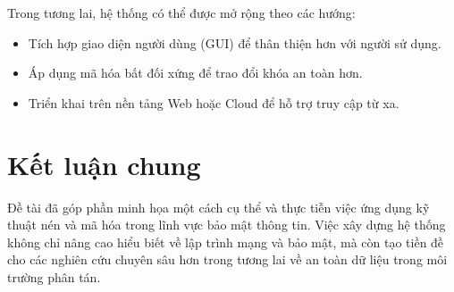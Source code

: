 Trong tương lai, hệ thống có thể được mở rộng theo các hướng:

\begin{itemize}
  \item Tích hợp giao diện người dùng (GUI) để thân thiện hơn với người sử dụng.
  \item Áp dụng mã hóa bất đối xứng để trao đổi khóa an toàn hơn.
  \item Triển khai trên nền tảng Web hoặc Cloud để hỗ trợ truy cập từ xa.
\end{itemize}

\section{Kết luận chung}

Đề tài đã góp phần minh họa một cách cụ thể và thực tiễn việc ứng dụng kỹ thuật nén và mã hóa trong lĩnh vực bảo mật thông tin. Việc xây dựng hệ thống không chỉ nâng cao hiểu biết về lập trình mạng và bảo mật, mà còn tạo tiền đề cho các nghiên cứu chuyên sâu hơn trong tương lai về an toàn dữ liệu trong môi trường phân tán.
